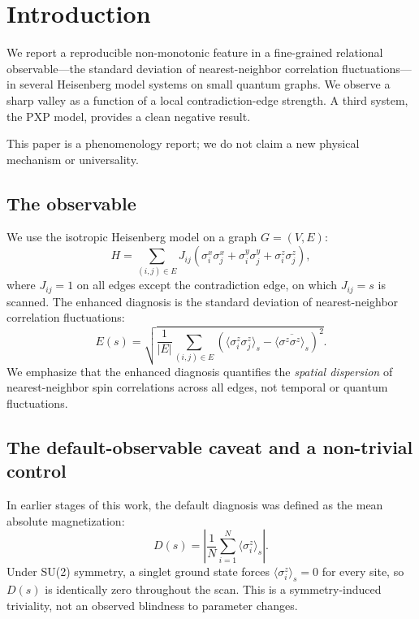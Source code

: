 \documentclass[aps,prb,reprint,superscriptaddress]{revtex4-2}
\begin{document}
\section{Introduction}

We report a reproducible non-monotonic feature in a fine-grained relational observable---the standard deviation of nearest-neighbor correlation fluctuations---in several Heisenberg model systems on small quantum graphs. We observe a sharp valley as a function of a local contradiction-edge strength. A third system, the PXP model, provides a clean negative result.

This paper is a phenomenology report; we do not claim a new physical mechanism or universality.

\subsection{The observable}

We use the isotropic Heisenberg model on a graph $G=(V,E)$:
\begin{equation}
H = \sum_{(i,j)\in E} J_{ij}\left(\sigma_i^x\sigma_j^x + \sigma_i^y\sigma_j^y + \sigma_i^z\sigma_j^z\right),
\end{equation}
where $J_{ij}=1$ on all edges except the contradiction edge, on which $J_{ij}=s$ is scanned. The enhanced diagnosis is the standard deviation of nearest-neighbor correlation fluctuations:
\begin{equation}
E(s)=\sqrt{\frac{1}{|E|}\sum_{(i,j)\in E}\left(\langle\sigma_i^z\sigma_j^z\rangle_s-\overline{\langle\sigma^z\sigma^z\rangle_s}\right)^2}.
\end{equation}
We emphasize that the enhanced diagnosis quantifies the \emph{spatial dispersion} of nearest-neighbor spin correlations across all edges, not temporal or quantum fluctuations.

\subsection{The default-observable caveat and a non-trivial control}

In earlier stages of this work, the default diagnosis was defined as the mean absolute magnetization:
\begin{equation}
D(s)=\left|\frac{1}{N}\sum_{i=1}^N\langle\sigma_i^z\rangle_s\right|.
\end{equation}
Under SU(2) symmetry, a singlet ground state forces $\langle\sigma_i^z\rangle_s=0$ for every site, so $D(s)$ is identically zero throughout the scan. This is a symmetry-induced triviality, not an observed blindness to parameter changes.
\end{document}
